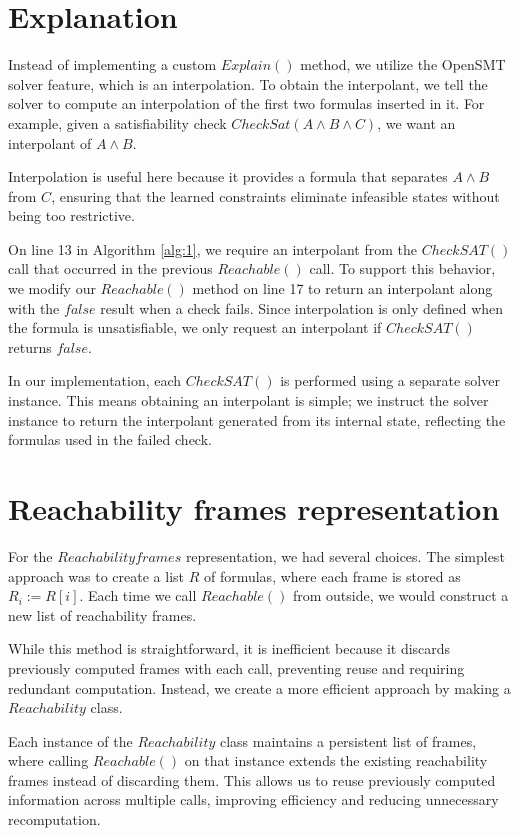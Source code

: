 \section*{Explanation} \label{Explain}
\noindent Instead of implementing a custom \( Explain() \) method, we utilize the OpenSMT solver feature, which is an interpolation. To obtain the interpolant, we tell the solver to compute an interpolation of the first two formulas inserted in it. For example, given a satisfiability check $CheckSat(A \land B \land C)$, we want an interpolant of $A \land B$.

Interpolation is useful here because it provides a formula that separates $A \land B$ from $C$, ensuring that the learned constraints eliminate infeasible states without being too restrictive.

On line 13 in Algorithm \ref{alg:1}, we require an interpolant from the \( CheckSAT() \) call that occurred in the previous \( Reachable() \) call. To support this behavior, we modify our \( Reachable() \) method on line 17 to return an interpolant along with the \( false \) result when a check fails. Since interpolation is only defined when the formula is unsatisfiable, we only request an interpolant if \( CheckSAT() \) returns \( false \).

In our implementation, each \( CheckSAT() \) is performed using a separate solver instance. This means obtaining an interpolant is simple; we instruct the solver instance to return the interpolant generated from its internal state, reflecting the formulas used in the failed check.

\section*{Reachability frames representation}\label{RFrames}
\noindent For the \( Reachability frames \) representation, we had several choices. The simplest approach was to create a list $R$ of formulas, where each frame is stored as $R_i := R[i]$. Each time we call \( Reachable() \) from outside, we would construct a new list of reachability frames.

While this method is straightforward, it is inefficient because it discards previously computed frames with each call, preventing reuse and requiring redundant computation. Instead, we create a more efficient approach by making a \( Reachability \) class.

Each instance of the \( Reachability \) class  maintains a persistent list of frames, where calling \( Reachable() \) on that instance extends the existing reachability frames instead of discarding them. This allows us to reuse previously computed information across multiple calls, improving efficiency and reducing unnecessary recomputation.

